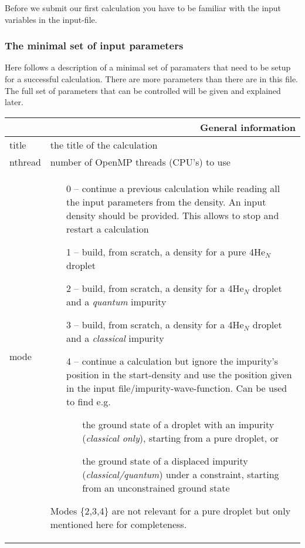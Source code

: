 \documentclass[10pt,a4paper]{article}
\begin{document}
	Before we submit our first calculation you have to be familiar with the input variables in the input-file.
	
	\subsubsection{The minimal set of input parameters}
	Here follows a description of a minimal set of paramaters that need to be setup for a successful calculation. There are more parameters than there are in this file. The full set of parameters that can be controlled will be given and explained later.
	
	\begin{center}
		\begin{tabular}{l|p{9.6cm}}
			\multicolumn{2}{r}{\textbf{General information}} \\
			\hline\hline
			title		& the title of the calculation	\\
			\hline
			nthread		& number of OpenMP threads (CPU's) to use	\\
			\hline
			mode		&
			\begin{enumerate}
				\item[0 --] continue a previous calculation while reading all the input parameters from the density. An input density should be provided. This allows to stop and restart a calculation
				\item[1 --] build, from scratch, a density for a pure 4He$_N$ droplet
				\item[2 --] build, from scratch, a density for a 4He$_N$ droplet and a \emph{quantum} impurity
				\item[3 --] build, from scratch,  a density for a 4He$_N$ droplet and a \emph{classical} impurity
				\item[4 --] continue a calculation but ignore the impurity's position in the start-density and use the position given in the input file/impurity-wave-function. Can be used to find e.g.
				\begin{itemize}
					\item[\ding{105}] the ground state of a droplet with an impurity (\emph{classical only}), starting from a pure droplet, or 
					\item[\ding{105}] the ground state of a displaced impurity (\emph{classical/quantum}) under a constraint, starting from an unconstrained ground state
				\end{itemize}
			\end{enumerate}
			\vspace{10px}
			Modes \{2,3,4\} are not relevant for a pure droplet but only mentioned here for completeness.
		\end{tabular}
		

\end{center}
\end{document}
